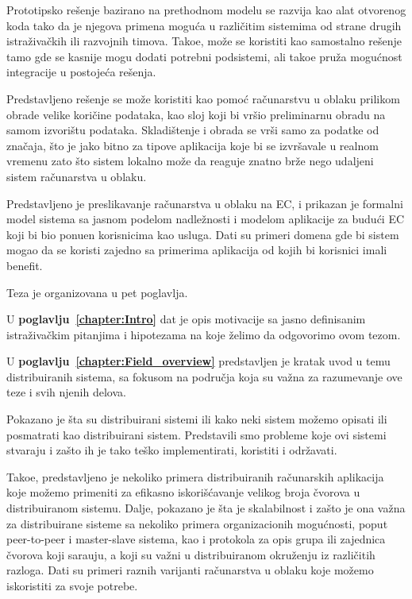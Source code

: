 Prototipsko re\v senje bazirano na prethodnom modelu se razvija kao alat otvorenog koda tako da je njegova primena mogu\'ca u razli\v citim sistemima od strane drugih istra\v ziva\v ckih ili razvojnih timova. Tako\dj e, mo\v ze se koristiti kao samostalno re\v senje tamo gde se kasnije mogu dodati potrebni podsistemi, ali tako\dj e pru\v za mogu\'cnost integracije u postoje\'ca re\v senja.

Predstavljeno re\v senje se mo\v ze koristiti kao pomo\'c ra\v cunarstvu u oblaku prilikom obrade velike kori\v cine podataka, kao sloj koji bi vr\v sio preliminarnu obradu na samom izvori\v stu podataka. Skladi\v stenje i obrada se vr\v si samo za podatke od zna\v caja, \v sto je jako bitno za tipove aplikacija koje bi se izvr\v savale u realnom vremenu zato \v sto sistem lokalno mo\v ze da reaguje znatno br\v ze nego udaljeni sistem ra\v cunarstva u oblaku.

Predstavljeno je preslikavanje ra\v cunarstva u oblaku na EC, i prikazan je formalni model sistema sa jasnom podelom nadle\v znosti i modelom aplikacije za budu\'ci EC koji bi bio ponu\dj en korisnicima kao usluga. Dati su primeri domena gde bi sistem mogao da se koristi zajedno sa primerima aplikacija od kojih bi korisnici imali benefit. 

\noindent
Teza je organizovana u pet poglavlja.

U \textbf{poglavlju~\ref{chapter:Intro}} dat je opis motivacije sa jasno definisanim istra\v ziva\v ckim pitanjima i hipotezama na koje \v zelimo da odgovorimo ovom tezom.

U \textbf{poglavlju~\ref{chapter:Field_overview}} predstavljen je kratak uvod u temu distribuiranih sistema, sa fokusom na podru\v cja koja su va\v zna za razumevanje ove teze i svih njenih delova.

Pokazano je \v sta su distribuirani sistemi ili kako neki sistem mo\v zemo opisati ili posmatrati kao distribuirani sistem. Predstavili smo probleme koje ovi sistemi stvaraju i za\v sto ih je tako te\v sko implementirati, koristiti i odr\v zavati.

Tako\dj e, predstavljeno je nekoliko primera distribuiranih ra\v cunarskih aplikacija koje mo\v zemo primeniti za efikasno iskori\v s\'cavanje velikog broja \v cvorova u distribuiranom sistemu. Dalje, pokazano je \v sta je skalabilnost i za\v sto je ona va\v zna za distribuirane sisteme sa nekoliko primera organizacionih mogu\'cnosti, poput peer-to-peer i master-slave sistema, kao i protokola za opis grupa ili zajednica \v cvorova koji sara\dj uju, a koji su va\v zni u distribuiranom okru\v zenju iz razli\v citih razloga. Dati su primeri raznih varijanti ra\v cunarstva u oblaku koje mo\v zemo iskoristiti za svoje potrebe.

